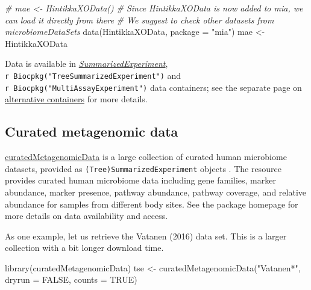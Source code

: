 \documentclass[
]{book}
\newenvironment{Shaded}{\begin{snugshade}}{\end{snugshade}}
\newcommand{\AttributeTok}[1]{\textcolor[rgb]{0.77,0.63,0.00}{#1}}
\newcommand{\CommentTok}[1]{\textcolor[rgb]{0.56,0.35,0.01}{\textit{#1}}}
\newcommand{\ConstantTok}[1]{\textcolor[rgb]{0.00,0.00,0.00}{#1}}
\newcommand{\FunctionTok}[1]{\textcolor[rgb]{0.00,0.00,0.00}{#1}}
\newcommand{\NormalTok}[1]{#1}
\newcommand{\OtherTok}[1]{\textcolor[rgb]{0.56,0.35,0.01}{#1}}
\newcommand{\StringTok}[1]{\textcolor[rgb]{0.31,0.60,0.02}{#1}}
\begin{document}
\begin{Shaded}
\begin{Highlighting}[]
\CommentTok{\# mae \textless{}{-} HintikkaXOData()}
\CommentTok{\# Since HintikkaXOData is now added to mia, we can load it directly from there}
\CommentTok{\# We suggest to check other datasets from microbiomeDataSets}
\FunctionTok{data}\NormalTok{(HintikkaXOData, }\AttributeTok{package =} \StringTok{"mia"}\NormalTok{)}
\NormalTok{mae }\OtherTok{\textless{}{-}}\NormalTok{ HintikkaXOData}
\end{Highlighting}
\end{Shaded}

Data is available in \emph{\href{https://bioconductor.org/packages/3.17/SummarizedExperiment}{SummarizedExperiment}}, \texttt{r\ Biocpkg("TreeSummarizedExperiment")} and \texttt{r\ Biocpkg("MultiAssayExperiment")} data containers; see the separate
page on \href{https://microbiome.github.io/OMA/multitable.html}{alternative
containers} for more
details.

\hypertarget{curated-metagenomic-data}{%
\subsection{Curated metagenomic data}\label{curated-metagenomic-data}}

\href{https://bioconductor.org/packages/release/data/experiment/html/curatedMetagenomicData.html}{curatedMetagenomicData}
is a large collection of curated human microbiome datasets, provided as
\texttt{(Tree)SummarizedExperiment} objects \citep{Pasolli2017}. The resource
provides curated human microbiome data including gene families, marker
abundance, marker presence, pathway abundance, pathway coverage, and
relative abundance for samples from different body sites. See the
package homepage for more details on data availability and access.

As one example, let us retrieve the Vatanen (2016) \citep{Vatanen2016} data
set. This is a larger collection with a bit longer download time.

\begin{Shaded}
\begin{Highlighting}[]
\FunctionTok{library}\NormalTok{(curatedMetagenomicData)}
\NormalTok{tse }\OtherTok{\textless{}{-}} \FunctionTok{curatedMetagenomicData}\NormalTok{(}\StringTok{"Vatanen*"}\NormalTok{, }\AttributeTok{dryrun =} \ConstantTok{FALSE}\NormalTok{, }\AttributeTok{counts =} \ConstantTok{TRUE}\NormalTok{)}
\end{Highlighting}
\end{Shaded}
\end{document}
